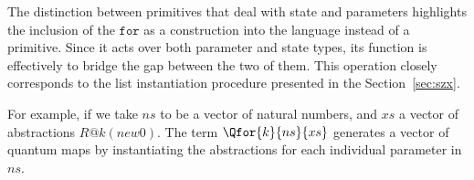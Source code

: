 The distinction between primitives that deal with state and parameters highlights the inclusion of the $\mathtt{for}$ as a construction into the language instead of a primitive. Since it acts over both parameter and state types, its function is effectively to bridge the gap between the two of them. This operation closely corresponds to the list instantiation procedure presented in the Section~\ref{sec:szx}.

For example, if we take $ns$ to be a vector of natural numbers, and $xs$ a vector of abstractions $R @k (new 0)$. The term $\Qfor{k}{ns}{xs}$ generates a vector of quantum maps by instantiating the abstractions for each individual parameter in $ns$.
